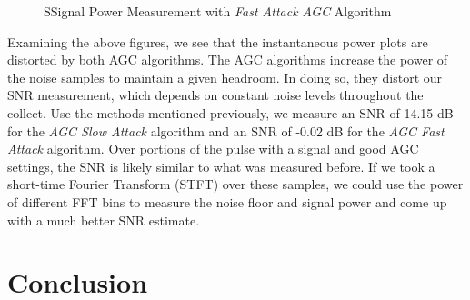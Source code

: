 \documentclass{article}
\begin{document}
\begin{figure}[H]
	\centerline{}
	\caption{SSignal Power Measurement with \textit{Fast Attack AGC} Algorithm}
	\label{fig::snr_agc_fast_attack_30db_tx_atten}
\end{figure}

Examining the above figures, we see that the instantaneous power plots are distorted by both AGC algorithms. The AGC algorithms increase the power of the noise samples to maintain a given headroom. In doing so, they distort our SNR measurement, which depends on constant noise levels throughout the collect. Use the methods mentioned previously, we measure an SNR of 14.15 dB for the \textit{AGC Slow Attack} algorithm and an SNR of -0.02 dB for the \textit{AGC Fast Attack} algorithm. Over portions of the pulse with a signal and good AGC settings, the SNR is likely similar to what was measured before. If we took a short-time Fourier Transform (STFT) over these samples, we could use the power of different FFT bins to measure the noise floor and signal power and come up with a much better SNR estimate. 

\section{Conclusion}

\nocite{analog_devices_libiio_error}

{}
%
	
\end{document}
